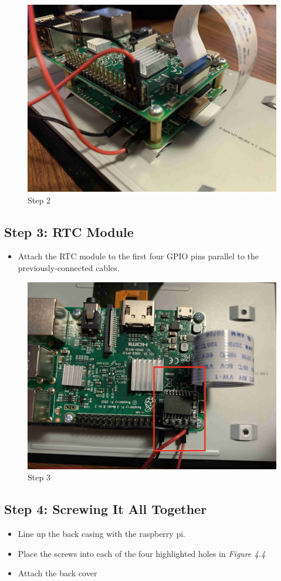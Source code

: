 \documentclass{article}
\numberwithin{figure}{section}
\begin{document}
\begin{figure}[H]
\centering
\includegraphics[width=0.7\columnwidth]{./resources/comp-1.jpeg}
\caption{Step 2}
\end{figure}

\subsection{Step 3: RTC Module}
\begin{itemize}
  \item Attach the RTC module to the first four GPIO pins parallel to the previously-connected cables.
\end{itemize}

\begin{figure}[H]
\centering
\includegraphics[width=0.7\columnwidth]{./resources/comp-2.jpeg}
\caption{Step 3}
\end{figure}

\subsection{Step 4: Screwing It All Together}
\begin{itemize}
  \item Line up the back casing with the raspberry pi.
  \item Place the screws into each of the four highlighted holes in \emph{Figure 4.4}
  \item Attach the back cover
\end{itemize}
\end{document}
